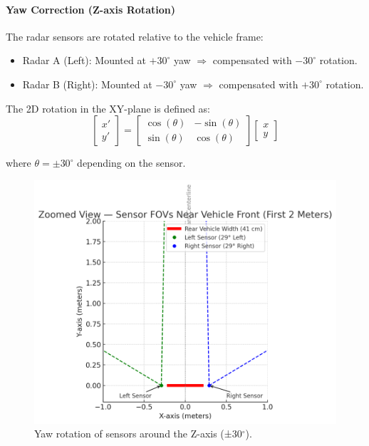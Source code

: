 \paragraph{Yaw Correction (Z-axis Rotation)}
The radar sensors are rotated relative to the vehicle frame:

\begin{itemize}
    \item Radar A (Left): Mounted at $+30^\circ$ yaw $\Rightarrow$ compensated with $-30^\circ$ rotation.
    \item Radar B (Right): Mounted at $-30^\circ$ yaw $\Rightarrow$ compensated with $+30^\circ$ rotation.
\end{itemize}

The 2D rotation in the XY-plane is defined as:
\[
\begin{bmatrix}
x' \\
y'
\end{bmatrix}
=
\begin{bmatrix}
\cos(\theta) & -\sin(\theta) \\
\sin(\theta) & \cos(\theta)
\end{bmatrix}
\begin{bmatrix}
x \\
y
\end{bmatrix}
\]

where $\theta = \pm30^\circ$ depending on the sensor.

\begin{figure}[!htbp]
    \centering
    \includegraphics[width=0.8\linewidth]{images/SensorsRotation.png}
    \caption{Yaw rotation of sensors around the Z-axis (±30$^\circ$).}
    \label{fig:z_axis_rotation}
\end{figure}

